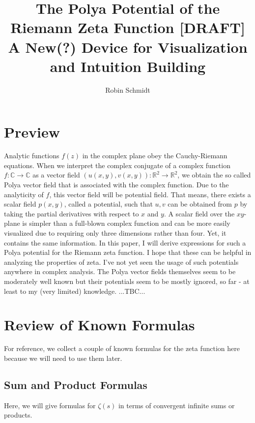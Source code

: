 \documentclass[12pt]{article}
\begin{document}
\parindent=0in
\parskip=0pt

 \setcounter{page}{1}

\title{The Polya Potential of the Riemann Zeta Function [DRAFT]\\ {\Large A New(?) Device for Visualization and Intuition Building}}
\author{Robin Schmidt}
\maketitle

\section{Preview}
Analytic functions $f(z)$ in the complex plane obey the Cauchy-Riemann equations. When we interpret the complex conjugate of a complex function $f: \mathbb{C} \rightarrow \mathbb{C}$ as a vector field $(u(x,y), v(x,y)): \mathbb{R}^2 \rightarrow \mathbb{R}^2$, we obtain the so called Polya vector field that is associated with the complex function. Due to the analyticity of $f$, this vector field will be potential field. That means, there exists a scalar field $p(x,y)$, called a potential, such that $u,v$ can be obtained from $p$ by taking the partial derivatives with respect to $x$ and $y$. A scalar field over the $xy$-plane is simpler than a full-blown complex function and can be more easily visualized due to requiring only three dimensions rather than four. Yet, it contains the same information. In this paper, I will derive expressions for such a Polya potential for the Riemann zeta function. I hope that these can be helpful in analyzing the properties of zeta. I've not yet seen the usage of such potentials anywhere in complex analysis. The Polya vector fields themselves seem to be moderately well known but their potentials seem to be mostly ignored, so far - at least to my (very limited) knowledge.  ...TBC...

\section{Review of Known Formulas}
For reference, we collect a couple of known formulas for the zeta function here because we will need to use them later.

\subsection{Sum and Product Formulas}
Here, we will give formulas for $\zeta(s)$ in terms of convergent infinite sums or products.
\end{document}
